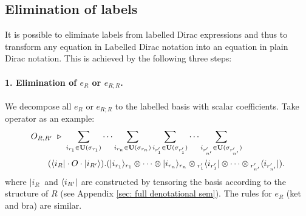 \subsection{Elimination of labels}
It is possible to eliminate labels from labelled Dirac expressions and
thus to transform any equation in Labelled Dirac notation into an
equation in plain Dirac notation. This is achieved by the following
three steps:

\paragraph*{1. Elimination of $e_R$ or $e_{R;R}$.}
We decompose all $e_R$ or $e_{R;R}$ to the labelled basis with scalar coefficients. 
Take operator as an example:
\begin{align*}
    & O_{R,R'} \ \triangleright\ \sum_{i_{r_1}\in\mathbf{U}(\sigma_{r_1})}\cdots \sum_{i_{r_n}\in\mathbf{U}(\sigma_{r_n})}
    \sum_{i_{r'_1}\in\mathbf{U}(\sigma_{r'_1})}\cdots \sum_{i_{r'_{n'}}\in\mathbf{U}(\sigma_{r'_{n'}})} \\
    & \qquad (\langle i_R|\cdot O\cdot |i_{R'}\rangle).(|i_{r_1}\rangle_{r_1}\otimes\cdots\otimes|i_{r_n}\rangle_{r_n} \otimes {}_{r'_1}\langle i_{r'_1}|\otimes\cdots\otimes{}_{r'_{n'}}\langle i_{r'_{n'}}|).
\end{align*}
where $|i_R\>$ and $\langle i_{R'}|$ are constructed by tensoring the basis according to the structure of $R$ (see Appendix \ref{sec: full denotational sem}). The rules for $e_R$ (ket and bra) are similar.


